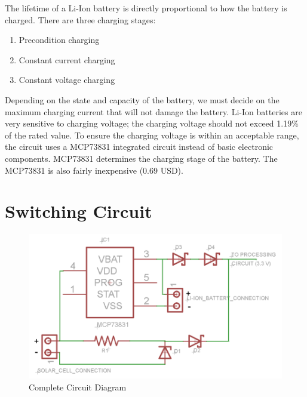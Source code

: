 
The lifetime of a Li-Ion battery is directly proportional to how the battery is charged. There are three charging stages:

\begin{enumerate}
\item Precondition charging
\item Constant current charging
\item Constant voltage charging
\end{enumerate}

Depending on the state and capacity of the battery, we must decide on the maximum charging current that will not damage the battery. Li-Ion batteries are very sensitive to charging voltage; the charging voltage should not exceed 1.19\% of the rated value. To ensure the charging voltage is within an acceptable range, the circuit uses a MCP73831 \cite{bib_mcp73831} integrated circuit instead of basic electronic components. MCP73831 determines the charging stage of the battery. The MCP73831 is also fairly inexpensive (0.69 USD).%

\section{Switching Circuit}

\begin{figure}[htbp]
\centering
\includegraphics[width=\columnwidth]{correct_ckt.PNG}
\caption{Complete Circuit Diagram}
\label{img_circuit}
\end{figure}

